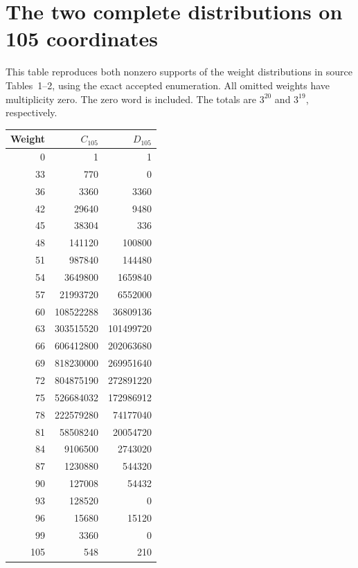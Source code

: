 \appendix
\section{The two complete distributions on 105 coordinates}
This table reproduces both nonzero supports of the weight distributions
in source Tables~1--2, using the exact accepted enumeration. All omitted
weights have multiplicity zero. The zero word is included. The totals are
$3^{20}$ and $3^{19}$, respectively.
\begin{center}
\begin{tabular}{r|r|r}
\toprule
Weight&$C_{105}$&$D_{105}$\\\midrule
0&1&1\\
33&770&0\\
36&3360&3360\\
42&29640&9480\\
45&38304&336\\
48&141120&100800\\
51&987840&144480\\
54&3649800&1659840\\
57&21993720&6552000\\
60&108522288&36809136\\
63&303515520&101499720\\
66&606412800&202063680\\
69&818230000&269951640\\
72&804875190&272891220\\
75&526684032&172986912\\
78&222579280&74177040\\
81&58508240&20054720\\
84&9106500&2743020\\
87&1230880&544320\\
90&127008&54432\\
93&128520&0\\
96&15680&15120\\
99&3360&0\\
105&548&210\\
\bottomrule
\end{tabular}
\end{center}
